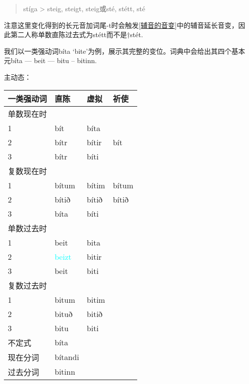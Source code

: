 \begin{quote}
    stíga > steig, steigt, steig或sté, stétt, sté
\end{quote}

注意这里变化得到的长元音加词尾-t时会触发\ref{辅音的音变}中的辅音延长音变，因此第二人称单数直陈过去式为stétt而不是†stét.

我们以一类强动词bíta
`bite'为例，展示其完整的变位。词典中会给出其四个基本元bíta --- beit
--- bitu -- bitinn.

主动态：

\begin{longtable}{llll}
    \toprule
    一类强动词 & 直陈                    & 虚拟  & 祈使  \\
    \midrule
    \endhead
    \bottomrule
    \endfoot
    单数现在时 &                         &       &       \\
    1          & bít                     & bíta  &       \\
    2          & bítr                    & bítir & bít   \\
    3          & bítr                    & bíti  &       \\
    复数现在时 &                         &       &       \\
    1          & bítum                   & bítim & bítum \\
    2          & bítið                   & bítið & bítið \\
    3          & bíta                    & bíti  &       \\
    单数过去时 &                         &       &       \\
    1          & beit                    & bita  &       \\
    2          & \textcolor{cyan}{beizt} & bitir &       \\
    3          & beit                    & biti  &       \\
    复数过去时 &                         &       &       \\
    1          & bitum                   & bitim &       \\
    2          & bituð                   & bitið &       \\
    3          & bitu                    & biti  &       \\
    不定式     & bíta                    &       &       \\
    现在分词   & bítandi                 &       &       \\
    过去分词   & bitinn                  &       &       \\
\end{longtable}


